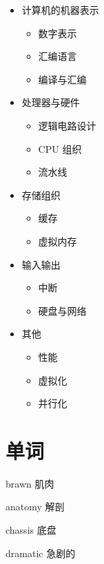 \documentclass[cn,11pt,chinese,black,simple]{../elegantbook}
\begin{document}
\begin{itemize}
    \item 计算机的机器表示
    \begin{itemize}
        \item 数字表示
        \item 汇编语言
        \item 编译与汇编    
    \end{itemize} 
    \item 处理器与硬件
    \begin{itemize}
        \item 逻辑电路设计
        \item  CPU 组织
        \item  流水线
    \end{itemize}
    \item 存储组织
    \begin{itemize}
        \item 缓存
        \item 虚拟内存
    \end{itemize}
    \item 输入输出
    \begin{itemize}
        \item 中断
        \item 硬盘与网络
    \end{itemize}
    \item 其他
    \begin{itemize}
        \item 性能
        \item 虚拟化
        \item 并行化
    \end{itemize}
\end{itemize}


\section*{单词}

brawn 肌肉

anatomy 解剖

chassis 底盘

dramatic 急剧的

\let\chapname\undefined
\ifx\mainclass\undefined
\end{document}
